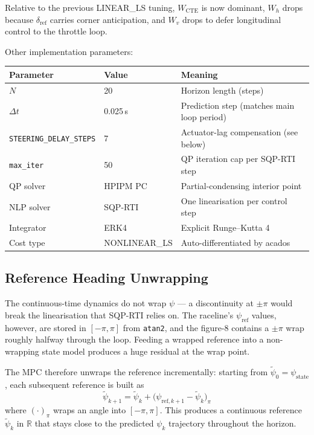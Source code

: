 \documentclass[11pt]{article}
\begin{document}
Relative to the previous LINEAR\_LS tuning, $W_{\text{CTE}}$ is now dominant,
$W_h$ drops because $\delta_{\text{ref}}$ carries corner anticipation, and
$W_v$ drops to defer longitudinal control to the throttle loop.

Other implementation parameters:

\medskip
\begin{center}
\begin{tabular}{lll}
\toprule
Parameter & Value & Meaning \\
\midrule
$N$                       & 20       & Horizon length (steps) \\
$\Delta t$                & 0.025\,s & Prediction step (matches main loop period) \\
\texttt{STEERING\_DELAY\_STEPS} & 7        & Actuator-lag compensation (see below) \\
\texttt{max\_iter}        & 50       & QP iteration cap per SQP-RTI step \\
QP solver                 & HPIPM PC & Partial-condensing interior point \\
NLP solver                & SQP-RTI  & One linearisation per control step \\
Integrator                & ERK4     & Explicit Runge--Kutta 4 \\
Cost type                 & NONLINEAR\_LS & Auto-differentiated by acados \\
\bottomrule
\end{tabular}
\end{center}

\subsection{Reference Heading Unwrapping}

The continuous-time dynamics do not wrap $\psi$ --- a discontinuity at $\pm\pi$
would break the linearisation that SQP-RTI relies on.  The raceline's
$\psi_{\text{ref}}$ values, however, are stored in $[-\pi, \pi]$ from
\texttt{atan2}, and the figure-8 contains a $\pm\pi$ wrap roughly halfway
through the loop.  Feeding a wrapped reference into a non-wrapping state model
produces a huge residual at the wrap point.

The MPC therefore unwraps the reference incrementally: starting from
$\tilde{\psi}_0 = \psi_{\text{state}}$, each subsequent reference is built as
\[
\tilde{\psi}_{k+1} = \tilde{\psi}_k + \big(\psi_{\text{ref},k+1} - \tilde{\psi}_k\big)_\pi
\]
where $(\cdot)_\pi$ wraps an angle into $[-\pi, \pi]$.  This produces a
continuous reference $\tilde{\psi}_k$ in $\mathbb{R}$ that stays close to the
predicted $\psi_k$ trajectory throughout the horizon.
\end{document}
